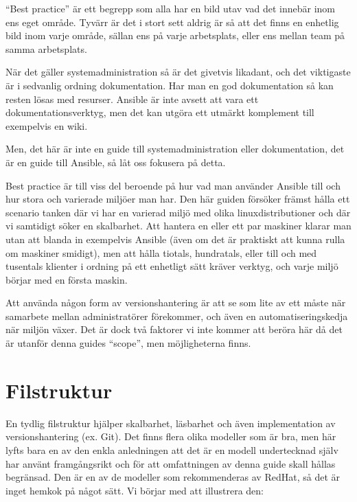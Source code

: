``Best practice'' är ett begrepp som alla har en bild utav vad det innebär inom ens eget område.
Tyvärr är det i stort sett aldrig är så att det finns en enhetlig bild inom varje område, sällan ens
på varje arbetsplats, eller ens mellan team på samma arbetsplats.

När det gäller systemadministration så är det givetvis likadant, och det viktigaste är i sedvanlig ordning dokumentation.
Har man en god dokumentation så kan resten lösas med resurser. Ansible är inte avsett att vara ett dokumentationsverktyg,
men det kan utgöra ett utmärkt komplement till exempelvis en wiki.

Men, det här är inte en guide till systemadministration eller dokumentation, det är en guide till Ansible, så låt 
oss fokusera på detta.

Best practice är till viss del beroende på hur vad man använder Ansible till och hur stora och varierade miljöer
man har. Den här guiden försöker främst hålla ett scenario tanken där vi har en varierad miljö med olika 
linuxdistributioner och där vi samtidigt söker en skalbarhet. Att hantera en eller ett par maskiner klarar man utan
att blanda in exempelvis Ansible (även om det är praktiskt att kunna rulla om maskiner smidigt), men att hålla
tiotals, hundratals, eller till och med tusentals klienter i ordning på ett enhetligt sätt kräver verktyg, och varje
miljö börjar med en första maskin.

Att använda någon form av versionshantering är att se som lite av ett måste när samarbete mellan administratörer
förekommer, och även en automatiseringskedja när miljön växer. Det är dock två faktorer vi inte kommer att beröra
här då det är utanför denna guides ``scope'', men möjligheterna finns.

\section{Filstruktur}
En tydlig filstruktur hjälper skalbarhet, läsbarhet och även implementation av versionshantering (ex. Git). Det 
finns flera olika modeller som är bra, men här lyfts bara en av den enkla anledningen att det är en modell 
undertecknad själv har använt framgångsrikt och för att omfattningen av denna guide skall hållas begränsad. Den 
är en av de modeller som rekommenderas av RedHat, så det är inget hemkok på något sätt. Vi börjar med att illustrera
den:

